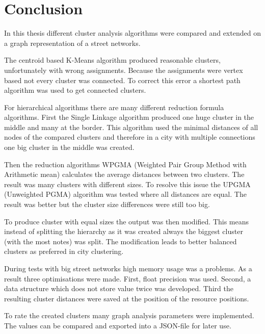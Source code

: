 \chapter{Conclusion}
In this thesis different cluster analysis algorithms were compared and extended on a graph representation of a street networks.

The centroid based K-Means algorithm produced reasonable clusters, unfortunately with wrong assignments. Because the assignments were vertex based not every cluster was connected. To correct this error a shortest path algorithm was used to get connected clusters.

For hierarchical algorithms there are many different reduction formula algorithms. First the Single Linkage algorithm produced one huge cluster in the middle and many at the border. This algorithm used the minimal distances of all nodes of the compared clusters and therefore in a city with multiple connections one big cluster in the middle was created.

Then the reduction algorithms WPGMA (Weighted Pair Group Method with Arithmetic mean) calculates the average distances between two clusters. The result was many clusters with different sizes. To resolve this issue the UPGMA (Unweighted PGMA) algorithm was tested where all distances are equal. The result was better but the cluster size differences were still too big.

To produce cluster with equal sizes the output was then modified. This means instead of splitting the hierarchy as it was created always the biggest cluster (with the most notes) was split. The modification leads to better balanced clusters as preferred in city clustering.

During tests with big street networks high memory usage was a problems. As a result three optimisations were made. First, float precision was used. Second, a data structure which does not store value twice was developed. Third the resulting cluster distances were saved at the position of the resource positions. 

To rate the created clusters many graph analysis parameters were implemented. The values can be compared and exported into a JSON-file for later use.